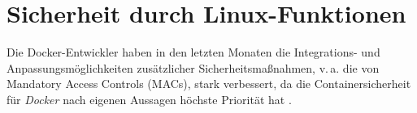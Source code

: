 \documentclass[../main.tex]{subfiles}
\begin{document}









\chapter{Sicherheit durch Linux-Funktionen}
\label{secLinux}
	Die Docker-Entwickler haben in den letzten Monaten die Integrations- und Anpassungsmöglichkeiten zusätzlicher Sicherheitsmaßnahmen, v.\,a. die von Mandatory Access Controls (MACs), stark verbessert, da die Containersicherheit für \emph{Docker} nach eigenen Aussagen höchste Priorität hat \cite{githubDockerRoadmap}\cite{githubDockerChangelog}.
\end{document}

